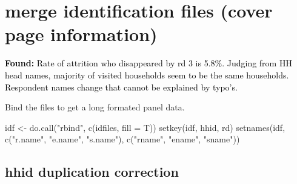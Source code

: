 \section{merge identification files (cover page information)}

\textcolor{black}{\textbf{Found:} Rate of attrition who disappeared by rd 3 is 5.8\%. Judging from HH head names, majority of visited households seem to be the same households. Respondent names change that cannot be explained by typo's.}


Bind the files to get a long formated panel data.
\begin{Schunk}
\begin{Sinput}
idf <- do.call("rbind", c(idfiles, fill = T))
setkey(idf, hhid, rd)
setnames(idf, c("r.name", "e.name", "s.name"), c("rname", "ename", "sname"))
\end{Sinput}
\end{Schunk}

\subsection{hhid duplication correction}

